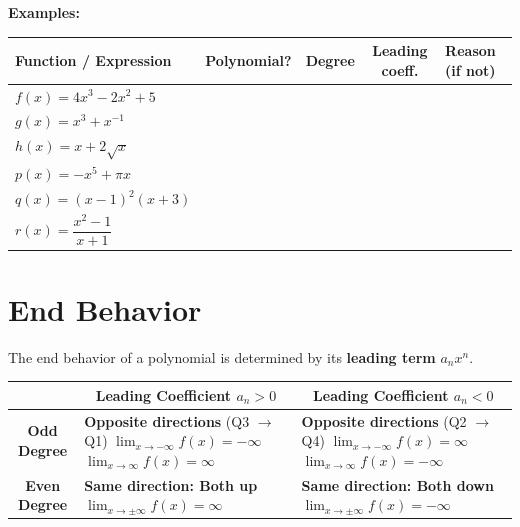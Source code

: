 \documentclass[12pt]{article}
\begin{document}
\textbf{Examples:}
\begin{center}
\renewcommand{\arraystretch}{1.2}
\begin{tabular}{|l|c|c|c|l|}
\hline
\textbf{Function / Expression} & \textbf{Polynomial?} & \textbf{Degree} & \textbf{Leading coeff.} & \textbf{Reason (if not)} \\
\hline
\rule{0pt}{2.6ex}$f(x)=4x^3 - 2x^2 + 5$ &  &  &  &  \\
\hline
\rule{0pt}{2.6ex}$g(x)=x^3 + x^{-1}$ &  &  &  &  \\
\hline
\rule{0pt}{2.6ex}$h(x)=x + 2\sqrt{x}$ &  &  &  &  \\
\hline
\rule{0pt}{2.6ex}$p(x)=-x^5 + \pi x$ &  &  &  &  \\
\hline
\rule{0pt}{2.6ex}$q(x)=(x-1)^2(x+3)$ &  &  &  &  \\
\hline
\rule{0pt}{2.6ex}$r(x)=\dfrac{x^2-1}{x+1}$ &  &  &  &  \\
\hline
\end{tabular}
\end{center}

\section{End Behavior}
The end behavior of a polynomial is determined by its \textbf{leading term} $a_n x^n$.

\begin{center}
\renewcommand{\arraystretch}{2}
\begin{tabular}{|c|p{6.5cm}|p{6.5cm}|}
\hline
 & \multicolumn{1}{c|}{\textbf{Leading Coefficient $a_n > 0$}} & \multicolumn{1}{c|}{\textbf{Leading Coefficient $a_n < 0$}} \\
\hline
\textbf{Odd Degree} & 
  \textbf{Opposite directions} (Q3 $\to$ Q1) \newline
  $\lim_{x \to -\infty} f(x) = -\infty$ \newline
  $\lim_{x \to \infty} f(x) = \infty$ 
&
  \textbf{Opposite directions} (Q2 $\to$ Q4) \newline
  $\lim_{x \to -\infty} f(x) = \infty$ \newline
  $\lim_{x \to \infty} f(x) = -\infty$ \\
\hline
\textbf{Even Degree} & 
  \textbf{Same direction: Both up} \newline
  $\lim_{x \to \pm \infty} f(x) = \infty$
&
  \textbf{Same direction: Both down} \newline
  $\lim_{x \to \pm \infty} f(x) = -\infty$ \\
\hline
\end{tabular}
\end{center}
\end{document}
